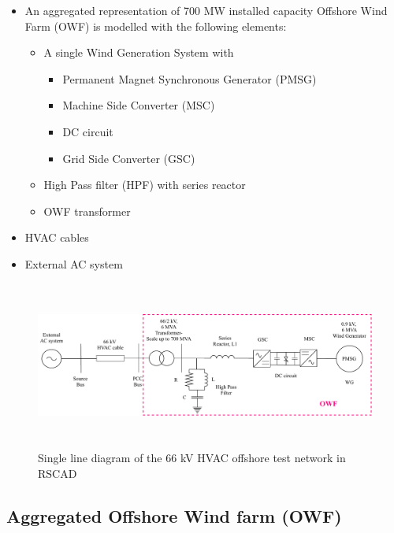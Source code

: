 \begin{itemize}
    \item An aggregated representation of 700 MW installed capacity Offshore Wind Farm (\gls{OWF}) is modelled with the following elements:
    \begin{itemize}
        \item A single Wind Generation System with 
    \begin{itemize}
        \item Permanent Magnet Synchronous Generator (\gls{PMSG})
        \item Machine Side Converter (\gls{MSC})
        \item \gls{DC} circuit
        \item Grid Side Converter (\gls{GSC}) 
    \end{itemize}
        \item High Pass filter (\gls{HPF}) with series reactor
        \item \gls{OWF} transformer
    \end{itemize}
    \item \gls{HVAC} cables  
     \item External \gls{AC} system
\end{itemize}

\begin{figure}[H]
\centering
    \includegraphics[height = 5.5cm,width = \textwidth]{Diagrams/Chapter_3/WT1_AC_RSCAD_OWF.pdf}
    \caption{Single line diagram of the 66 kV HVAC offshore test network in RSCAD}
    \label{fig:WT1_Model_RSCAD}
\end{figure}

\subsection{ Aggregated Offshore Wind farm (OWF)}\label{OWF}

